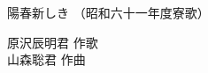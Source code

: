 \documentclass[10pt,b5j]{tarticle} %
\begin{document}
\begin{minipage}[c]{0.7\hsize} %
    \begin{center}
        {\LARGE
            陽春新しき %
        }
        {\small 
            （昭和六十一年度寮歌） %
        }
    \end{center}
\end{minipage}
\begin{minipage}[c]{0.3\hsize} %
    \begin{flushright} %
        原沢辰明君 作歌\\山森聡君 作曲 %
    \end{flushright}
\end{minipage}
\end{document}
